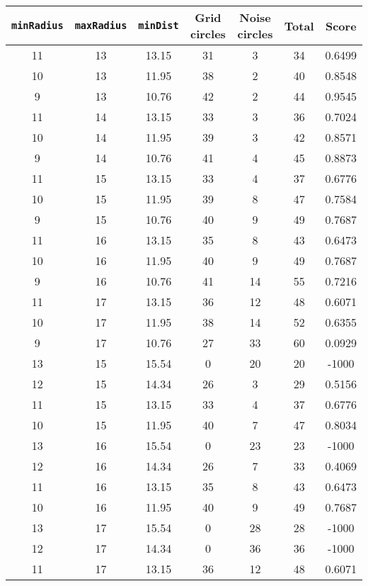 \documentclass[letterpaper, 12pt]{article}
\begin{document}
\begin{longtable}{|c|c|c|c|c|c|c|}
\hline
\textbf{\texttt{minRadius}} & \textbf{\texttt{maxRadius}} & \textbf{\texttt{minDist}} & \textbf{Grid circles} & \textbf{Noise circles} & \textbf{Total} & \textbf{Score} \\
\hline
11 & 13 & 13.15 & 31 & 3 & 34 & 0.6499 \\
\hline
10 & 13 & 11.95 & 38 & 2 & 40 & 0.8548 \\
\hline
9 & 13 & 10.76 & 42 & 2 & 44 & 0.9545 \\
\hline
11 & 14 & 13.15 & 33 & 3 & 36 & 0.7024 \\
\hline
10 & 14 & 11.95 & 39 & 3 & 42 & 0.8571 \\
\hline
9 & 14 & 10.76 & 41 & 4 & 45 & 0.8873 \\
\hline
11 & 15 & 13.15 & 33 & 4 & 37 & 0.6776 \\
\hline
10 & 15 & 11.95 & 39 & 8 & 47 & 0.7584 \\
\hline
9 & 15 & 10.76 & 40 & 9 & 49 & 0.7687 \\
\hline
11 & 16 & 13.15 & 35 & 8 & 43 & 0.6473 \\
\hline
10 & 16 & 11.95 & 40 & 9 & 49 & 0.7687 \\
\hline
9 & 16 & 10.76 & 41 & 14 & 55 & 0.7216 \\
\hline
11 & 17 & 13.15 & 36 & 12 & 48 & 0.6071 \\
\hline
10 & 17 & 11.95 & 38 & 14 & 52 & 0.6355 \\
\hline
9 & 17 & 10.76 & 27 & 33 & 60 & 0.0929 \\
\hline
13 & 15 & 15.54 & 0 & 20 & 20 & -1000 \\
\hline
12 & 15 & 14.34 & 26 & 3 & 29 & 0.5156 \\
\hline
11 & 15 & 13.15 & 33 & 4 & 37 & 0.6776 \\
\hline
10 & 15 & 11.95 & 40 & 7 & 47 & 0.8034 \\
\hline
13 & 16 & 15.54 & 0 & 23 & 23 & -1000 \\
\hline
12 & 16 & 14.34 & 26 & 7 & 33 & 0.4069 \\
\hline
11 & 16 & 13.15 & 35 & 8 & 43 & 0.6473 \\
\hline
10 & 16 & 11.95 & 40 & 9 & 49 & 0.7687 \\
\hline
13 & 17 & 15.54 & 0 & 28 & 28 & -1000 \\
\hline
12 & 17 & 14.34 & 0 & 36 & 36 & -1000 \\
\hline
11 & 17 & 13.15 & 36 & 12 & 48 & 0.6071 \\

\end{longtable}
\end{document}
